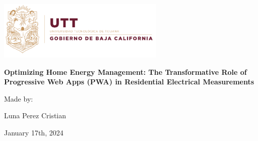 \documentclass{article}
\begin{document}
	\begin{center}
		\includegraphics[width=0.6\textwidth]{img/UTT.png}
		\vspace{2cm}

		{\fontsize{24pt}{28.8pt}\selectfont {}\selectfont \textbf{Optimizing Home Energy Management: The Transformative Role of Progressive Web Apps (PWA) in Residential Electrical Measurements}}
		\vspace{1cm}

		{\Large Made by:}

		\vspace{0.5cm}
		{\fontsize{12pt}{28.8pt}\selectfont Luna Perez Cristian}
		
		{\large January 17th, 2024}
	\end{center}
\end{document}
